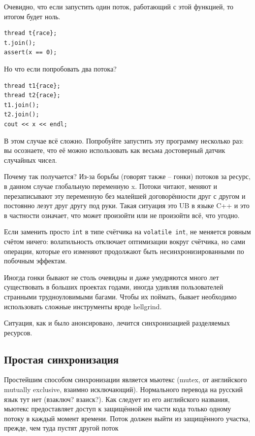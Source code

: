 \documentclass[a4paper,12pt,oneside]{book}
\begin{document}
Очевидно, что если запустить один поток, работающий с этой функцией, то итогом будет ноль.

\begin{lstlisting}
thread t{race};
t.join();
assert(x == 0);
\end{lstlisting}

Но что если попробовать два потока?

\begin{lstlisting}
thread t1{race};
thread t2{race};
t1.join();
t2.join();
cout << x << endl;
\end{lstlisting}

В этом случае всё сложно. Попробуйте запустить эту программу несколько раз: вы осознаете, что её можно использовать как весьма достоверный датчик случайных чисел.

Почему так получается? Из-за борьбы (говорят также -- гонки) потоков за ресурс, в данном случае глобальную переменную x. Потоки читают, меняют и перезаписывают эту переменную без малейшей договорённости друг с другом и постоянно лезут друг другу под руки. Такая ситуация это UB в языке C++ и это в частности означает, что может произойти или не произойти всё, что угодно.

Если заменить просто \lstinline!int! в типе счётчика на \lstinline!volatile int!, не меняется ровным счётом ничего: волатильность отключает оптимизации вокруг счётчика, но сами операции, которые его изменяют продолжают быть несинхронизированными по побочным эффектам.

Иногда гонки бывают не столь очевидны и даже умудряются много лет существовать в больших проектах годами, иногда удивляя пользователей странными трудноуловимыми багами. Чтобы их поймать, бывает необходимо использовать сложные инструменты вроде hellgrind.

Ситуация, как и было анонсировано, лечится синхронизацией разделяемых ресурсов.

\subsection{Простая синхронизация}\label{sub:mutex}

Простейшим способом синхронизации является мьютекс (mutex, от английского mutually exclusive, взаимно исключающий). Нормального перевода на русский язык тут нет (взаключ? взаиск?). Как следует из его английского названия, мьютекс предоставляет доступ к защищённой им части кода только одному потоку в каждый момент времени. Поток должен выйти из защищённого участка, прежде, чем туда пустят другой поток
\end{document}
